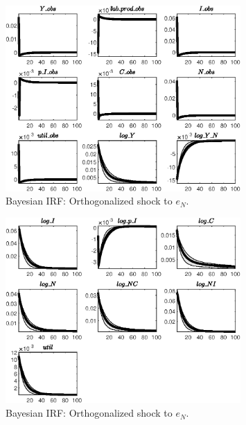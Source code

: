 \begin{figure}[H]
\centering 
\includegraphics[width=0.80\textwidth]{BRS_imp_mobility_alt/Output/BRS_imp_mobility_alt_Bayesian_IRF_e_N_1}
\caption{Bayesian IRF: Orthogonalized shock to ${e_N}$.}
\label{Fig:BayesianIRF:e_N:1}
\end{figure}
 
\begin{figure}[H]
\centering 
\includegraphics[width=0.80\textwidth]{BRS_imp_mobility_alt/Output/BRS_imp_mobility_alt_Bayesian_IRF_e_N_2}
\caption{Bayesian IRF: Orthogonalized shock to ${e_N}$.}
\label{Fig:BayesianIRF:e_N:2}
\end{figure}
 
